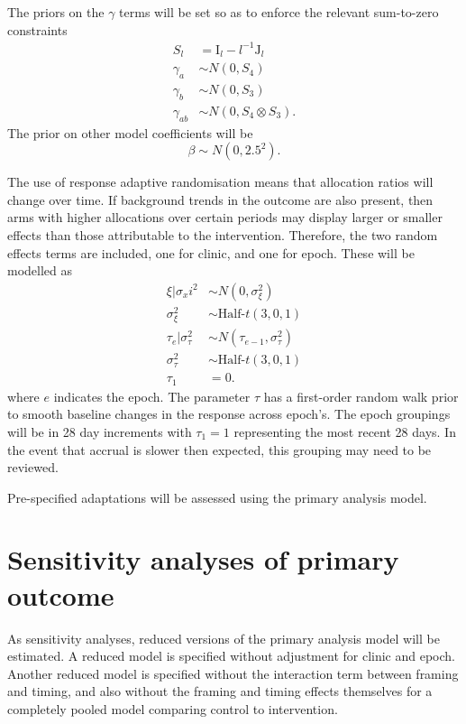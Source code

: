 \documentclass[
  bibliography=totoc]{scrreprt}
\begin{document}
The priors on the \(\gamma\) terms will be set so as to enforce the relevant sum-to-zero constraints
\[
\begin{aligned}
S_l &= \mathrm{I}_l - l^{-1}\mathrm{J}_l \\
\gamma_a &\sim N\left(0, S_4\right) \\
\gamma_b &\sim N\left(0, S_3\right) \\
\gamma_{ab} &\sim N\left(0, S_4\otimes S_3\right).
\end{aligned}
\]
The prior on other model coefficients will be
\[
\beta \sim N(0, 2.5^2).
\]

The use of response adaptive randomisation means that allocation ratios will change over time.
If background trends in the outcome are also present, then arms with higher allocations over certain periods may display larger or smaller effects than those attributable to the intervention.
Therefore, the two random effects terms are included, one for clinic, and one for epoch.
These will be modelled as
\[
\begin{aligned}
\xi|\sigma_xi^2 &\sim N(0, \sigma^2_\xi) \\
\sigma_\xi^2 &\sim \text{Half-}t(3, 0, 1) \\
\tau_e|\sigma_\tau^2 &\sim N(\tau_{e-1}, \sigma_\tau^2) \\
\sigma_\tau^2 &\sim \text{Half-}t(3, 0, 1) \\
\tau_1 &= 0.
\end{aligned}
\]
where \(e\) indicates the epoch.
The parameter \(\tau\) has a first-order random walk prior to smooth baseline changes in the response across epoch's.
The epoch groupings will be in 28 day increments with \(\tau_1=1\) representing the most recent 28 days.
In the event that accrual is slower then expected, this grouping may need to be reviewed.

Pre-specified adaptations will be assessed using the primary analysis model.

\hypertarget{sensitivity-analyses-of-primary-outcome}{%
\section{Sensitivity analyses of primary outcome}\label{sensitivity-analyses-of-primary-outcome}}

As sensitivity analyses, reduced versions of the primary analysis model will be estimated.
A reduced model is specified without adjustment for clinic and epoch.
Another reduced model is specified without the interaction term between framing and timing, and also without the framing and timing effects themselves for a completely pooled model comparing control to intervention.
\end{document}
